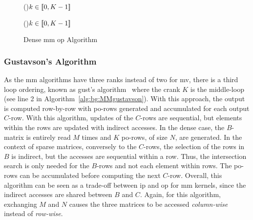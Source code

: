 \begin{figure}[htb]
    \begin{minipage}[t]{0.49\linewidth}
        \begin{algorithm}[H]
        \caption{Dense \acrlong{mv} \acrlong{op} Algorithm}
        \label{alg:bg:MVouter}
        \For(){$k \in [\![ 0, K-1 ]\!]$}{
        }
        \end{algorithm}
    \end{minipage}
    \hfill
    \begin{minipage}[t]{0.49\linewidth}
        \begin{algorithm}[H]
        \caption{Dense \acrlong{mm} \acrlong{op} Algorithm}
        \label{alg:bg:MMouter}
        \For(){$k \in [\![ 0, K-1 ]\!]$}{
        }
        \end{algorithm}
    \end{minipage}
\end{figure}

\subsubsection{Gustavson's Algorithm}

As the \acrshort{mm} algorithms have three \glspl{rank} instead of two for \acrshort{mv}, there is a third loop ordering, known as \acrlong{gust}'s algorithm~\cite{Gustavson1978_GustAlgo} where the \gls{crank} $K$ is the middle-loop (see line 2 in Algorithm~\ref{alg:bg:MMgustavson}).
With this approach, the output is computed row-by-row with \acrshort{po}-rows generated and accumulated for each output $C$-row.
With this algorithm, updates of the $C$-rows are sequential, but elements within the rows are updated with indirect accesses.
In the dense case, the $B$-matrix is entirely read $M$ times and $K$ \acrshort{po}-rows, of size $N$, are generated.
In the context of sparse matrices, conversely to the $C$-rows, the selection of the rows in $B$ is indirect, but the accesses are sequential within a row.
Thus, the \gls{intersection} search is only needed for the $B$-rows and not each element within rows.
The \acrshort{po}-rows can be accumulated before computing the next $C$-row.
Overall, this algorithm can be seen as a trade-off between \acrshort{ip} and \acrshort{op} for \acrshort{mm} kernels, since the indirect accesses are shared between $B$ and $C$.
Again, for this algorithm, exchanging $M$ and $N$ causes the three matrices to be accessed \emph{column-wise} instead of \emph{row-wise}.

